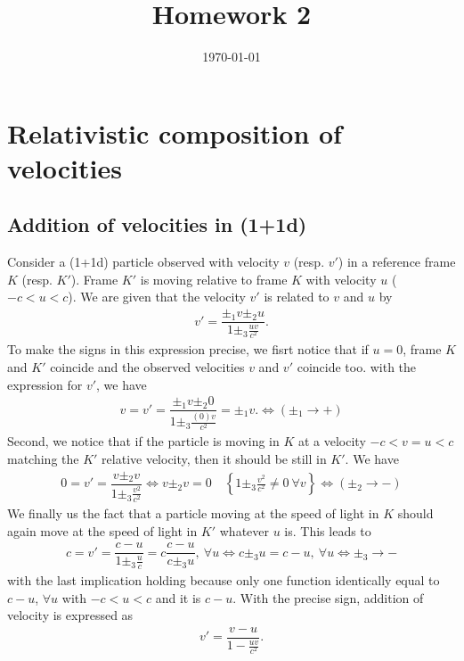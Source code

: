 \documentclass[10pt, a4paper]{article}
\title{Homework 2} %
\author{\PA} %
\date{\today} %
\begin{document}
\maketitlepage

\maketableofcontents

\footnotesize{
\section{Relativistic composition of velocities}
\subsection{Addition of velocities in (1+1d)} 
Consider a (1+1d) particle observed with velocity $v$ (resp. $v'$) in a reference frame $K$ (resp. $K'$). Frame $K'$ is moving relative to frame $K$ with velocity $u$ ($-c<u<c$). We are given that the velocity $v'$ is related to $v$ and $u$ by 
\begin{align*}
    v' = \dfrac{\pm_1 v \pm_2 u}{1 \pm_3 \frac{uv}{c^2}}.
\end{align*}
To make the signs in this expression precise, we fisrt notice that if $u = 0$, frame $K$ and $K'$ coincide and the observed velocities $v$ and $v'$ coincide too. with the expression for $v'$, we have
\begin{align*}
   v = v' = \dfrac{\pm_1 v \pm_2 0}{1 \pm_3 \frac{(0)v}{c^2}} = \pm_1 v. \iff (\pm_1 \to +)
\end{align*}
Second, we notice that if the particle is moving in $K$ at a velocity $ -c < v = u < c$ matching the $K'$ relative velocity, then it should be still in $K'$. We have 
\begin{align*}
    0 = v' = \dfrac{v \pm_2 v}{1 \pm_3 \frac{v^2}{c^2}} \iff v \pm_2 v = 0 \quad \left\{1 \pm_3 \frac{v^2}{c^2} \neq 0 \ \forall v\right\} \iff (\pm_2 \to -)
\end{align*}
We finally us the fact that a particle moving at the speed of light in $K$ should again move at the speed of light in $K'$ whatever $u$ is. This leads to
\begin{align*}
    c = v' = \dfrac{c - u}{1 \pm_3 \frac{u}{c}} = c \dfrac{c - u}{c \pm_3 u}, \ \forall u  \iff c \pm_3 u = c - u, \ \forall u \iff \pm_3 \to - 
\end{align*}
with the last implication holding because only one function identically equal to $c-u$, $\forall u$ with $-c<u<c$ and it is $c-u$. With the precise sign, addition of velocity is expressed as 
\begin{align*}
    v' = \dfrac{v - u}{1 - \frac{uv}{c^2}}.
\end{align*}

}
\end{document}
